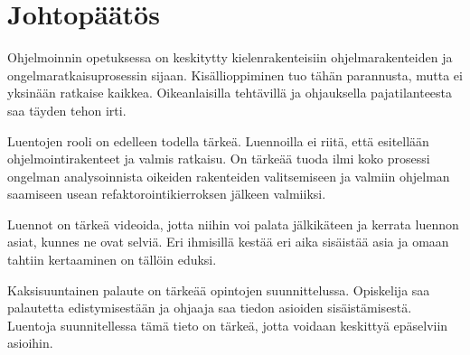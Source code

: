 \section{Johtopäätös}

Ohjelmoinnin opetuksessa on keskitytty kielenrakenteisiin ohjelmarakenteiden ja
ongelmaratkaisuprosessin sijaan. Kisällioppiminen tuo tähän parannusta, mutta ei
yksinään ratkaise kaikkea. Oikeanlaisilla tehtävillä ja ohjauksella
pajatilanteesta saa täyden tehon irti.

Luentojen rooli on edelleen todella tärkeä. Luennoilla ei riitä, että esitellään
ohjelmointirakenteet ja valmis ratkaisu. On tärkeää tuoda ilmi koko prosessi
ongelman analysoinnista oikeiden rakenteiden valitsemiseen ja valmiin ohjelman
saamiseen usean refaktorointikierroksen jälkeen valmiiksi.

Luennot on tärkeä videoida, jotta niihin voi palata jälkikäteen ja kerrata
luennon asiat, kunnes ne ovat selviä. Eri ihmisillä kestää eri aika sisäistää
asia ja omaan tahtiin kertaaminen on tällöin eduksi.

Kaksisuuntainen palaute on tärkeää opintojen suunnittelussa. Opiskelija saa
palautetta edistymisestään ja ohjaaja saa tiedon asioiden sisäistämisestä.
Luentoja suunnitellessa tämä tieto on tärkeä, jotta voidaan keskittyä epäselviin
asioihin.

